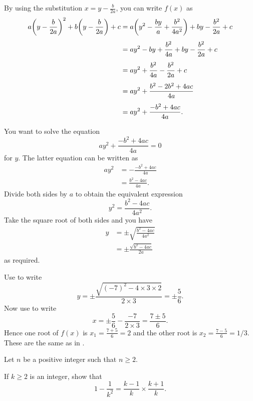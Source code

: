 \documentclass[a4paper,oneside,12pt]{article}
\begin{document}
\begin{problem}
{\begin{solution}
By using the substitution $x = y - \frac{b}{2a}$, you can write $f(x)$
as
\begin{align*}
a \parenthesis*{y - \frac{b}{2a}}^2
+
b \parenthesis*{y - \frac{b}{2a}}
+
c
&=
a \parenthesis*{y^2 - \frac{by}{a} + \frac{b^2}{4a^2}}
+
by - \frac{b^2}{2a}
+
c \\[4pt]
&=
ay^2 - by + \frac{b^2}{4a}
+
by - \frac{b^2}{2a}
+
c \\[4pt]
&=
ay^2 + \frac{b^2}{4a} - \frac{b^2}{2a} + c \\[4pt]
&=
ay^2
+
\frac{b^2 - 2b^2 + 4ac}{4a} \\[4pt]
&=
ay^2
+
\frac{-b^2 + 4ac}{4a}.
\end{align*}

You want to solve the equation
\[
ay^2
+
\frac{-b^2 + 4ac}{4a}
=
0
\]
for $y$.  The latter equation can be written as
\begin{align*}
ay^2
&=
-\frac{-b^2 + 4ac}{4a} \\[4pt]
&=
\frac{b^2 - 4ac}{4a}.
\end{align*}
Divide both sides by $a$ to obtain the equivalent expression
\[
y^2
=
\frac{b^2 - 4ac}{4a^2}.
\]
Take the square root of both sides and you have
\begin{align*}
y
&=
\pm\sqrt{
  \frac{
    b^2 - 4ac
  }{
    4a^2
  }
} \\[4pt]
&=
\pm
\frac{
  \sqrt{b^2 - 4ac}
}{
  2a
}
\end{align*}
as required.

Use 
to write
\[
y
=
\pm
\frac{
  \sqrt{(-7)^2 - 4 \times 3 \times 2}
}{
  2 \times 3
}
=
\pm\frac{5}{6}.
\]
Now use  to
write
\[
x
=
\pm\frac{5}{6}
-
\frac{-7}{2 \times 3}
=
\frac{7 \pm 5}{6}.
\]
Hence one root of $f(x)$ is $x_1 = \frac{7 + 5}{6} = 2$ and the other
root is $x_2 = \frac{7 - 5}{6} = 1/3$.  These are the same as in
.
\end{solution}
}{}

\item Let $n$ be a positive integer such that $n \geq 2$.
  \begin{packedenum}
  \item\label{subprob:quadroots:difference_two_squares_reciprocal_product_k}
    If $k \geq 2$ is an integer, show that
    \[
    1 - \frac{1}{k^2}
    =
    \frac{k - 1}{k}
    \times
    \frac{k + 1}{k}.
    \]


\end{packedenum}
\end{problem}
\end{document}
